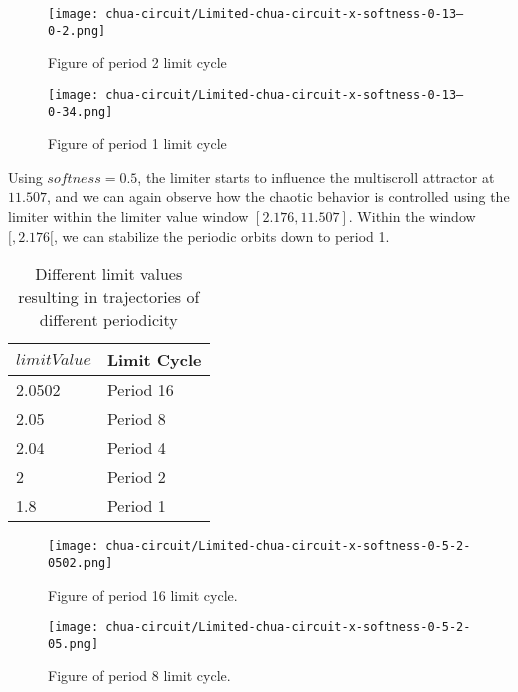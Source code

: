 \documentclass[main]{subfiles}
\begin{document}
\begin{figure}[H]
\centering
\texttt{[image: chua-circuit/Limited-chua-circuit-x-softness-0-13--0-2.png]}
\caption[Figure of period 3 limit cycle]{Figure of period 2 limit cycle}
\label{figure:x-0.13-2-limit-cycle-upperscroll-trajectory}
\end{figure}

\begin{figure}[H]
\centering
\texttt{[image: chua-circuit/Limited-chua-circuit-x-softness-0-13--0-34.png]}
\caption[Figure of period 1 limit cycle]{Figure of period 1 limit cycle}
\label{figure:x-0.13-1-limit-cycle-upperscroll-trajectory}
\end{figure}

Using \(softness=0.5\), the limiter starts to influence the multiscroll attractor at \(11.507\), and we can again observe how the chaotic behavior is controlled using the limiter within the limiter value window \([2.176,11.507]\). Within the window \([,2.176[\), we can stabilize the periodic orbits down to period 1.

\begin{table}[H]
\renewcommand{\arraystretch}{1.2}
\center
\begin{tabular}{@{}ll@{}}
	\toprule
   \(limitValue\) & Limit Cycle\\
   \midrule
   2.0502 & Period 16 \\
   2.05 & Period 8 \\ 
   2.04 & Period 4 \\
   2  & Period 2 \\
   1.8 & Period 1 \\
   \bottomrule
\end{tabular}
\caption{Different limit values resulting in trajectories of different periodicity}
\label{table:x-0.5-lowermost-periodicities}
\end{table}

\begin{figure}[H]
\centering
\texttt{[image: chua-circuit/Limited-chua-circuit-x-softness-0-5-2-0502.png]}
\caption[Figure of period 16 limit cycle]{Figure of period 16 limit cycle.}
\label{figure:x-0.5-16-limit-cycle-trajectory}
\end{figure}

\begin{figure}[H]
\centering
\texttt{[image: chua-circuit/Limited-chua-circuit-x-softness-0-5-2-05.png]}
\caption[Figure of period 8 limit cycle]{Figure of period 8 limit cycle.}
\label{figure:x-0.5-8-limit-cycle-trajectory}
\end{figure}
\end{document}
